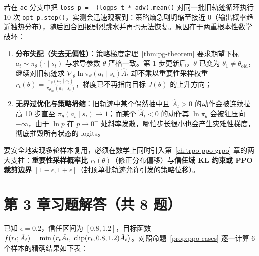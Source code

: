 若在 \texttt{ac} 分支中把 \texttt{loss\_p = -(logps\_t * adv).mean()} 对同一批旧轨迹循环执行 10 次 \texttt{opt\_p.step()}，实测会迅速观察到：策略熵急剧坍缩至接近 $0$（输出概率趋近独热分布），随后回合回报剧烈跳水并再也无法恢复。原因在于两重根本性数学破坏：
\begin{enumerate}
  \item \textbf{分布失配（失去无偏性）}：策略梯度定理~\ref{thm:pg-theorem} 要求期望下标 $a_t \sim \pi_\theta(\cdot \mid s_t)$ 与求导参数 $\theta$ 严格一致。第 1 步更新后，$\theta$ 已变为 $\theta_1 \neq \theta_{\mathrm{old}}$，继续对旧轨迹求 $\nabla_\theta \ln \pi_\theta(a_t \mid s_t) \hat{A}_t$ 却不乘以重要性采样权重 $r_t(\theta) = \frac{\pi_\theta(a_t \mid s_t)}{\pi_{\theta_{\mathrm{old}}}(a_t \mid s_t)}$，梯度已不再指向目标 $J(\theta)$ 的上升方向；
  \item \textbf{无界过优化与策略坍缩}：旧轨迹中某个偶然抽中且 $\hat{A}_t > 0$ 的动作会被连续拉高 10 步直至 $\pi_\theta(a_t \mid s_t) \to 1$；而某个 $\hat{A}_t < 0$ 的动作其 $\ln \pi_\theta$ 会被狂压向 $-\infty$，由于 $\ln p$ 在 $p \to 0^+$ 处斜率发散，哪怕步长很小也会产生灾难性梯度，彻底摧毁所有状态的 logits。
\end{enumerate}
要安全地实现多轮样本复用，必须在数学上同时引入第~\ref{ch:trpo-ppo-grpo} 章的两大支柱：\textbf{重要性采样概率比 $r_t(\theta)$}（修正分布偏移）与\textbf{信任域 KL 约束或 PPO 裁剪边界 $[1-\epsilon, 1+\epsilon]$}（封顶单批轨迹允许引发的策略位移）。

\section*{第 3 章习题解答（共 8 题）}


已知 $\epsilon = 0.2$，信任区间为 $[0.8, 1.2]$，目标函数 $f(r_t; \hat{A}_t) = \min\big(r_t \hat{A}_t,\; \operatorname{clip}(r_t, 0.8, 1.2)\hat{A}_t\big)$。对照命题~\ref{prop:ppo-cases} 逐一计算 6 个样本的精确结果如下表：

